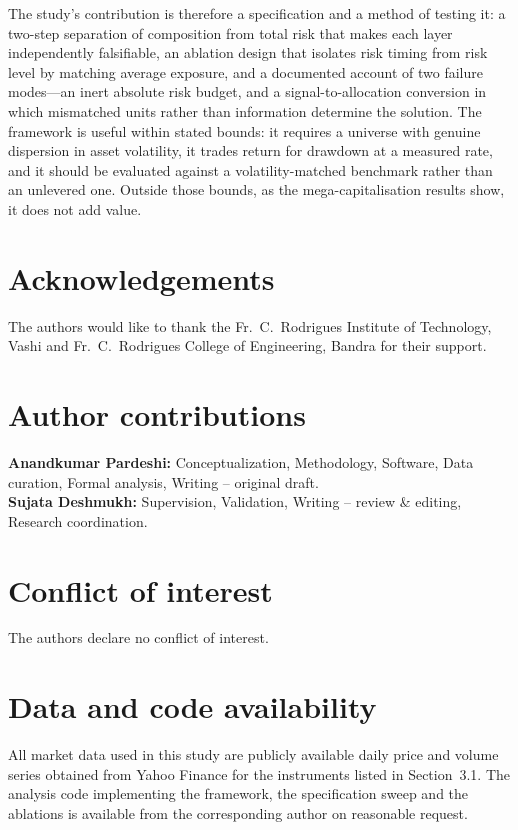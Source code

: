 \documentclass{singlecol-new}
\theoremstyle{TH}{
\newtheorem{lemma}{Lemma}
\newtheorem{theorem}[lemma]{Theorem}
\newtheorem{corrolary}[lemma]{Corrolary}
\newtheorem{conjecture}[lemma]{Conjecture}
\newtheorem{proposition}[lemma]{Proposition}
\newtheorem{claim}[lemma]{Claim}
\newtheorem{stheorem}[lemma]{Wrong Theorem}
\newtheorem{algorithm}{Algorithm}
}
\theoremstyle{THrm}{
\newtheorem{definition}{Definition}[section]
\newtheorem{question}{Question}[section]
\newtheorem{remark}{Remark}
\newtheorem{scheme}{Scheme}
}
\theoremstyle{THhit}{
\newtheorem{case}{Case}[section]
}
\begin{document}
The study's contribution is therefore a specification and a method of testing it: a
two-step separation of composition from total risk that makes each layer independently
falsifiable, an ablation design that isolates risk timing from risk level by matching
average exposure, and a documented account of two failure modes---an inert absolute risk
budget, and a signal-to-allocation conversion in which mismatched units rather than
information determine the solution. The framework is useful within stated bounds: it
requires a universe with genuine dispersion in asset volatility, it trades return for
drawdown at a measured rate, and it should be evaluated against a volatility-matched
benchmark rather than an unlevered one. Outside those bounds, as the mega-capitalisation
results show, it does not add value.


\section*{Acknowledgements}
\label{sec:declarations}
The authors would like to thank the Fr.~C.~Rodrigues Institute of Technology, Vashi and
Fr.~C.~Rodrigues College of Engineering, Bandra for their support.

\section*{Author contributions}
\textbf{Anandkumar Pardeshi:} Conceptualization, Methodology, Software, Data curation,
Formal analysis, Writing -- original draft.\\
\textbf{Sujata Deshmukh:} Supervision, Validation, Writing -- review \& editing,
Research coordination.

\section*{Conflict of interest}
The authors declare no conflict of interest.

\section*{Data and code availability}
All market data used in this study are publicly available daily price and volume series
obtained from Yahoo Finance for the instruments listed in Section~3.1. The analysis code
implementing the framework, the specification sweep and the ablations is available from
the corresponding author on reasonable request.
\end{document}
